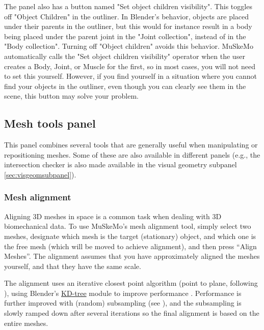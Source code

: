 \documentclass{article}
\begin{document}
The panel also has a button named "Set object children visibility". This toggles off "Object Children" in the outliner. In Blender's behavior, objects are placed under their parents in the outliner, but this would for instance result in a body being placed under the parent joint in the "Joint collection", instead of in the "Body collection". Turning off "Object children" avoids this behavior. MuSkeMo automatically calls the "Set object children visibility" operator when the user creates a Body, Joint, or Muscle for the first, so in most cases, you will not need to set this yourself. However, if you find yourself in a situation where you cannot find your objects in the outliner, even though you can clearly see them in the scene, this button may solve your problem.


\subsection{Mesh tools panel}
This panel combines several tools that are generally useful when manipulating or repositioning meshes. Some of these are also available in different panels (e.g., the intersection checker is also made available in the visual geometry subpanel \ref{sec:visgeomsubpanel}).

\subsubsection{Mesh alignment}
\label{sec:meshalignment}

Aligning 3D meshes in space is a common task when dealing with 3D biomechanical data. To use MuSkeMo's mesh alignment tool, simply select two meshes, designate which mesh is the target (stationary) object, and which one is the free mesh (which will be moved to achieve alignment), and then press ``Align Meshes''. The alignment assumes that you have approximately aligned the meshes yourself, and that they have the same scale.

The alignment uses an iterative closest point algorithm (point to plane, following \cite{chenObjectModelingRegistration1991}), using Blender's \href{https://docs.blender.org/api/current/mathutils.kdtree.html}{KD-tree} module to improve performance \cite{zhangIterativePointMatching1994}. Performance is further improved with (random) subsampling (see \cite{rusinkiewiczEfficientVariantsICP2001}), and the subsampling is slowly ramped down after several iterations so the final alignment is based on the entire meshes.
\end{document}
